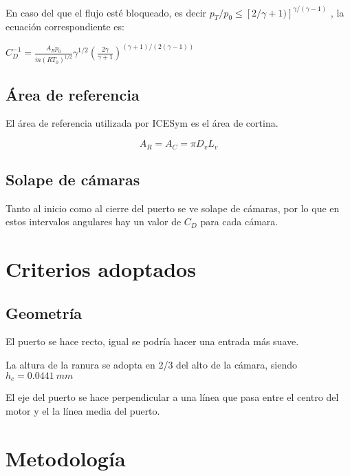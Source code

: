 En caso del que el flujo esté bloqueado, es decir
$p_T/p_0 \le [2/\gamma+1)]^{\gamma/(\gamma - 1)}$
, la ecuación correspondiente es:

\begin{math}
C_D^{-1} =  \frac {A_R p_0} {\dot{m} (R T_0)^{1/2}}
            \gamma^{1/2}
            \left( \frac{2\gamma}{\gamma+1} \right)^{(\gamma+1)/(2(\gamma-1))}
\end{math}

\subsection{Área de referencia}
El área de referencia utilizada por ICESym es el área de cortina.

$$ A_R = A_C = \pi D_v L_v $$

\subsection{Solape de cámaras}
Tanto al inicio como al cierre del puerto se ve solape de cámaras, por lo que
en estos intervalos angulares hay un valor de $C_D$ para cada cámara.

\section{Criterios adoptados}
\subsection{Geometría}
El puerto se hace recto, igual se podría hacer una entrada más suave.

La altura de la ranura se adopta en 2/3 del alto de la cámara, siendo $h_c=0.0441\ mm$

El eje del puerto se hace perpendicular a una línea que pasa entre el centro
del motor y el la línea media del puerto.





\section{Metodología}

